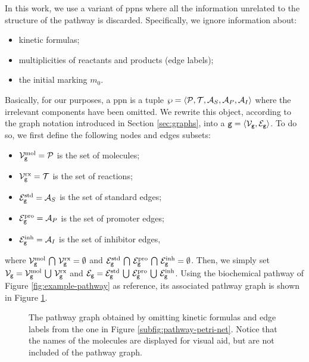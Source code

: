 In this work, we use a variant of \glspl{ppn} where all the information unrelated to the structure of the pathway is discarded. Specifically, we ignore information about:
\begin{itemize}
    \item kinetic formulas;
    \item multiplicities of reactants and products (\ie edge labels);
    \item the initial marking $m_0$.
\end{itemize}
Basically, for our purposes, a \gls{ppn} is a tuple $\wp = \Tuple{\Cal{P},\Cal{T},\Cal{A}_{S}, \Cal{A}_{P},\Cal{A}_{I}}$ where the irrelevant components have been omitted. We rewrite this object, according to the graph notation introduced in Section \ref{sec:graphs}, into a  $\Graph{g} = \Tuple{\Nodes_{\Graph{g}}, \Edges_{\Graph{g}}}$. To do so, we first define the following nodes and edges subsets:
\begin{itemize}
    \item $\Nodes_{\Graph{g}}^{\Fun{mol}} = \Cal{P}$ is the set of molecules;
    \item $\Nodes_{\Graph{g}}^{\Fun{rx}} = \Cal{T}$ is the set of reactions;
    \item $\Edges_{\Graph{g}}^{\Fun{std}} = \Cal{A}_S$ is the set of standard edges;
    \item $\Edges_{\Graph{g}}^{\Fun{pro}} = \Cal{A}_P$ is the set of promoter edges;
    \item $\Edges_{\Graph{g}}^{\Fun{inh}} = \Cal{A}_I$ is the set of inhibitor edges,
\end{itemize}
where $\Nodes_{\Graph{g}}^{\Fun{mol}} \Inter \Nodes_{\Graph{g}}^{\Fun{rx}} = \emptyset$ and $\Edges_{\Graph{g}}^{\Fun{std}} \Inter \Edges_{\Graph{g}}^{\Fun{pro}} \Inter \Edges_{\Graph{g}}^{\Fun{inh}} = \emptyset$. Then, we simply set $\Nodes_{\Graph{g}} = \Nodes_{\Graph{g}}^{\Fun{mol}} \Union \Nodes_{\Graph{g}}^{\Fun{rx}}$ and $\Edges_{\Graph{g}} = \Edges_{\Graph{g}}^{\Fun{std}} \Union \Edges_{\Graph{g}}^{\Fun{pro}} \Union \Edges_{\Graph{g}}^{\Fun{inh}}$.
Using the biochemical pathway of Figure \ref{fig:example-pathway} as reference, its associated pathway graph is shown in Figure \ref{fig:pathway-graph}.
\begin{figure}[h!]
    \centering
    \resizebox{.6\textwidth}{!}{}
    \caption{The pathway graph obtained by omitting kinetic formulas and edge labels from the one in Figure \ref{subfig:pathway-petri-net}. Notice that the names of the molecules are displayed for visual aid, but are not included of the pathway graph.}
    \label{fig:pathway-graph}
\end{figure}
